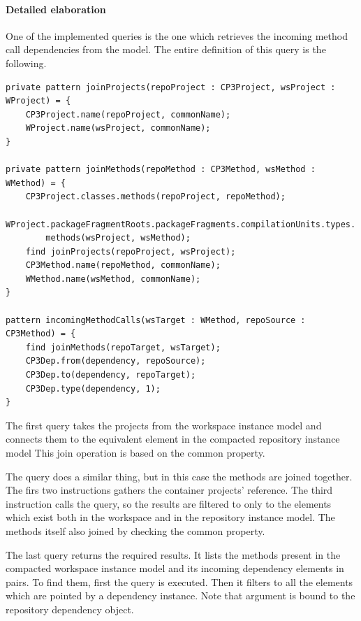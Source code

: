 \paragraph{Detailed elaboration}
One of the implemented queries is the one which retrieves the incoming method call 
dependencies from the model. The entire definition of this query is the following. 
\begin{lstlisting}[caption=Elements of the incoming method call dependency query,label=patternex]
private pattern joinProjects(repoProject : CP3Project, wsProject : WProject) = {
	CP3Project.name(repoProject, commonName);
	WProject.name(wsProject, commonName);
}

private pattern joinMethods(repoMethod : CP3Method, wsMethod : WMethod) = {
	CP3Project.classes.methods(repoProject, repoMethod);
	WProject.packageFragmentRoots.packageFragments.compilationUnits.types.
		methods(wsProject, wsMethod);
	find joinProjects(repoProject, wsProject);
	CP3Method.name(repoMethod, commonName);
	WMethod.name(wsMethod, commonName);
}

pattern incomingMethodCalls(wsTarget : WMethod, repoSource : CP3Method) = {
	find joinMethods(repoTarget, wsTarget);
	CP3Dep.from(dependency, repoSource);
	CP3Dep.to(dependency, repoTarget);
	CP3Dep.type(dependency, 1);
}
\end{lstlisting}

The first  query takes the projects from the workspace
instance model and connects them to the equivalent element in the compacted
repository instance model This join operation is based on the common 
property.

The  query does a similar thing, but in this case the methods
are joined together. The firs two instructions gathers the container projects'
reference. The third instruction calls the  query, so the 
results are filtered to only to the elements which exist both in the workspace
and in the repository instance model. The methods itself also joined by 
checking the common  property.

The last  query returns the required results. It lists
the methods present in the compacted workspace instance model and its incoming
dependency elements in pairs. To find them, first the  query
is executed. Then it filters to all the elements which are pointed by a
dependency instance. Note that  argument is bound to the
repository dependency object.

